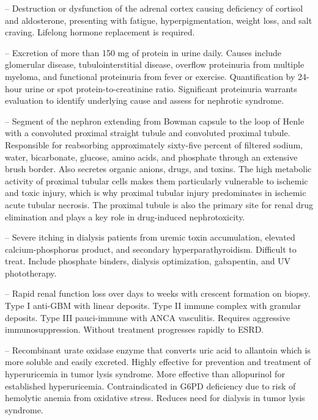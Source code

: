-- Destruction or dysfunction of the adrenal cortex causing deficiency of cortisol and aldosterone, presenting with fatigue, hyperpigmentation, weight loss, and salt craving. Lifelong hormone replacement is required.

-- Excretion of more than 150 mg of protein in urine daily. Causes include glomerular disease, tubulointerstitial disease, overflow proteinuria from multiple myeloma, and functional proteinuria from fever or exercise. Quantification by 24-hour urine or spot protein-to-creatinine ratio. Significant proteinuria warrants evaluation to identify underlying cause and assess for nephrotic syndrome.

-- Segment of the nephron extending from Bowman capsule to the loop of Henle with a convoluted proximal straight tubule and convoluted proximal tubule. Responsible for reabsorbing approximately sixty-five percent of filtered sodium, water, bicarbonate, glucose, amino acids, and phosphate through an extensive brush border. Also secretes organic anions, drugs, and toxins. The high metabolic activity of proximal tubular cells makes them particularly vulnerable to ischemic and toxic injury, which is why proximal tubular injury predominates in ischemic acute tubular necrosis. The proximal tubule is also the primary site for renal drug elimination and plays a key role in drug-induced nephrotoxicity.

-- Severe itching in dialysis patients from uremic toxin accumulation, elevated calcium-phosphorus product, and secondary hyperparathyroidism. Difficult to treat. Include phosphate binders, dialysis optimization, gabapentin, and UV phototherapy.

-- Rapid renal function loss over days to weeks with crescent formation on biopsy. Type I anti-GBM with linear deposits. Type II immune complex with granular deposits. Type III pauci-immune with ANCA vasculitis. Requires aggressive immunosuppression. Without treatment progresses rapidly to ESRD.

-- Recombinant urate oxidase enzyme that converts uric acid to allantoin which is more soluble and easily excreted. Highly effective for prevention and treatment of hyperuricemia in tumor lysis syndrome. More effective than allopurinol for established hyperuricemia. Contraindicated in G6PD deficiency due to risk of hemolytic anemia from oxidative stress. Reduces need for dialysis in tumor lysis syndrome.

